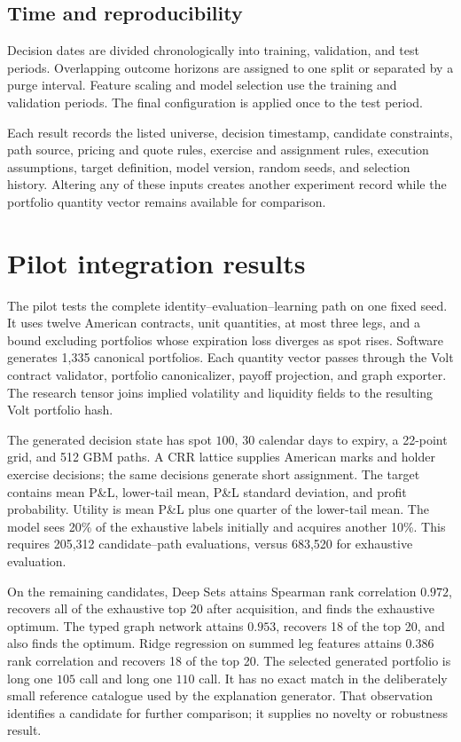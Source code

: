 \documentclass{strategynet-journal}
\newcommand{\VOLT}{\textsf{Volt}}
\begin{document}
\begin{SNcolumns}
\subsection{Time and reproducibility}

Decision dates are divided chronologically into training, validation, and test
periods.  Overlapping outcome horizons are assigned to one split or separated
by a purge interval.  Feature scaling and model selection use the training and
validation periods.  The final configuration is applied once to the test
period.

Each result records the listed universe, decision timestamp, candidate
constraints, path source, pricing and quote rules, exercise and assignment
rules, execution assumptions, target definition, model version, random seeds,
and selection history.  Altering any of these inputs creates another experiment
record while the portfolio quantity vector remains available for comparison.

\end{SNcolumns}

\section{Pilot integration results}
\label{sec:pilot}

The pilot tests the complete identity--evaluation--learning path on one fixed
seed.  It uses twelve American contracts, unit quantities, at most three legs,
and a bound excluding portfolios whose expiration loss diverges as spot rises.
Software generates 1,335 canonical portfolios.  Each quantity vector passes
through the \VOLT{} contract validator, portfolio canonicalizer, payoff
projection, and graph exporter.  The research tensor joins implied volatility
and liquidity fields to the resulting \VOLT{} portfolio hash.

The generated decision state has spot \(100\), 30 calendar days to expiry, a
22-point grid, and 512 GBM paths.  A CRR lattice supplies American marks and
holder exercise decisions; the same decisions generate short assignment.
The target contains mean P\&L, lower-tail mean, P\&L standard deviation, and
profit probability.  Utility is mean P\&L plus one quarter of the lower-tail
mean.  The model sees 20\% of the exhaustive labels initially and acquires
another 10\%.  This requires 205,312 candidate--path evaluations, versus
683,520 for exhaustive evaluation.

On the remaining candidates, Deep Sets attains Spearman rank correlation
\(0.972\), recovers all of the exhaustive top 20 after acquisition, and finds
the exhaustive optimum.  The typed graph network attains \(0.953\), recovers
18 of the top 20, and also finds the optimum.  Ridge regression on summed leg
features attains \(0.386\) rank correlation and recovers 18 of the top 20.
The selected generated portfolio is long one \(105\) call and long one
\(110\) call.  It has
no exact match in the deliberately small reference catalogue used by the
explanation generator.  That observation identifies a candidate for further
comparison; it supplies no novelty or robustness result.
\end{document}
